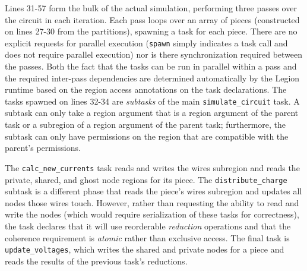 Lines 31-57 form the bulk of the actual simulation, performing three
passes over the circuit in each iteration.  Each pass loops over an
array of pieces (constructed on lines 27-30 from the partitions),
spawning a task for each piece.  There are no explicit requests for
parallel execution ({\tt spawn} simply indicates a task call and does
not require parallel execution) nor is there synchronization required
between the passes.  Both the fact that the tasks can be run in
parallel within a pass and the required inter-pass dependencies are
determined automatically by the Legion runtime based on the region
access annotations on the task declarations.  The tasks spawned on
lines 32-34 are {\em subtasks} of the main {\tt simulate\_circuit}
task. A subtask can only take a region argument that is a region
argument of the parent task or a subregion of a region argument of the
parent task; furthermore, the subtask can only have permissions on the
region that are compatible with the parent's permissions.  

The  {\tt calc\_new\_currents} task reads and writes the wires subregion 
and reads the private, shared, and ghost node regions for its piece.
The {\tt distribute\_charge} subtask is a different phase that reads the piece's 
wires subregion and updates all nodes those wires touch.  However,
rather than requesting the ability to read and write the nodes (which would
require serialization of these tasks for correctness), the task declares that
it will use reorderable {\em reduction} operations and that the coherence requirement
is {\em atomic} rather than exclusive access. The final task is 
{\tt update\_voltages}, which writes the shared and private nodes for a piece
and reads the results of the previous task's reductions.

  




